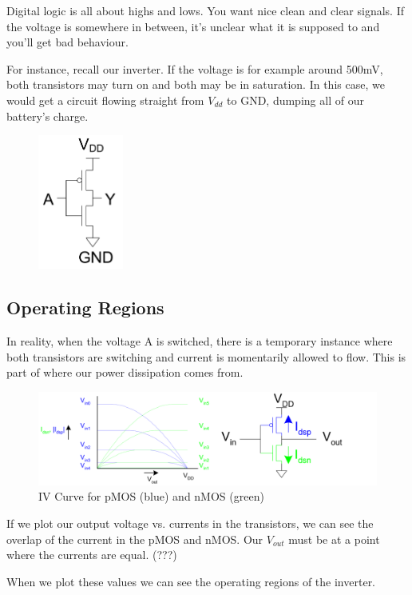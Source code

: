 \documentclass{article}
\begin{document}
Digital logic is all about highs and lows. You want nice clean and clear signals. If the voltage is somewhere in between, it's unclear what it is supposed to and you'll get bad behaviour. 

For instance, recall our inverter. If the voltage is for example around 500mV, both transistors may turn on and both may be in saturation. In this case, we would get a circuit flowing straight from $V_{dd}$ to GND, dumping all of our battery's charge.

\begin{figure}[ht!]
\centering
\includegraphics[width=28mm]{Inverter.png}
\end{figure}

\subsection{Operating Regions}

In reality, when the voltage A is switched, there is a temporary instance where both transistors are switching and current is momentarily allowed to flow. This is part of where our power dissipation comes from.  


\begin{figure}[ht!]
\centering
\includegraphics[width=130mm]{InverterIV.png}
\caption{IV Curve for pMOS (blue) and nMOS (green)}
\end{figure}

If we plot our output voltage vs. currents in the transistors, we can see the overlap of the current in the pMOS and nMOS. Our $V_{out}$ must be at a point where the currents are equal.  (???)

When we plot these values we can see the operating regions of the inverter. 
\end{document}
